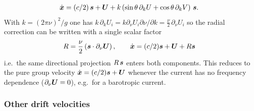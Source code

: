 \documentclass[12pt]{article}
\newcommand{\beq}  { \begin{eqnarray} }
\newcommand{\eeq}  { \end{eqnarray}}
\renewcommand{\v}[1]{{\mbox{\boldmath$ #1 $}}}  %
\newcommand{\Vec}[1]{\left(\begin{array}{c} #1 \end{array}\right) }
\newcommand{\p}{{\partial}}
\newcommand{\lk}{\left(}
\newcommand{\rk}{\right)}
\begin{document}
\beq \label{eq:xdot_full}
\dot{\v x} = (c/2)\,\v s + \v U + k \lk \sin\theta\, \p_k U + \cos\theta\, \p_k V \rk \, \v s .
\eeq
With $k = (2\pi \nu)^2/g$ one has
$k\,\p_k U_i = k \p_\nu U_i \p \nu/\p k = \frac{\nu}{2}\,\p_\nu U_i$
%
 so the radial correction can be written with
a single scalar factor
\beq \label{eq:xdot_disc}
R = \frac{\nu}{2}\lk \v s \cdot \p_\nu \v U  \rk ,
\qquad
\dot{\v x} %
= (c/2) \v s  + \v U + R \v s
\eeq
i.e.\ the same directional projection $R\,\v s$ enters both components. This reduces
to the pure group velocity $\dot{\v x} = (c/2)\v s + \v U$ whenever the current has no
frequency dependence ($\p_\nu \v U = 0$), e.g.\ for a barotropic current.

\subsubsection*{Other drift velocities}
\end{document}
